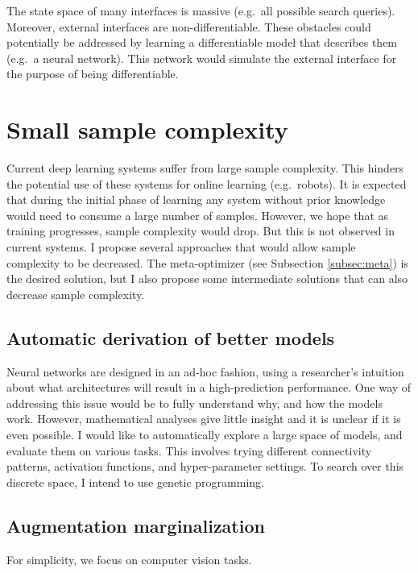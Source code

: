 \documentclass{article}
\begin{document}
The state space of many interfaces is massive (e.g.\ all possible search queries).
Moreover, external interfaces are non-differentiable.
These obstacles could potentially be addressed by learning a differentiable 
model that describes them (e.g.~a neural network). This network would simulate the
external interface for the purpose of being differentiable. 

\section{Small sample complexity}
Current deep learning systems suffer from large sample
complexity. This hinders the potential use of these systems for online 
learning (e.g.~robots). It is expected that during the initial phase of 
learning any system without prior knowledge would need to consume a large number of samples. 
However, we hope that as training progresses, sample complexity would drop. But this is 
not observed in current systems. I propose several approaches that would
allow sample complexity to be decreased. 
The meta-optimizer (see Subsection \ref{subsec:meta}) is the desired
solution, but I also propose some intermediate solutions that can also
decrease sample complexity.

\subsection{Automatic derivation of better models}
Neural networks are designed in an ad-hoc fashion, using a researcher's
intuition about what architectures will result in a high-prediction
performance. One way of addressing this issue would be to
fully understand why, and how the models work. However, mathematical
analyses give little insight and it is unclear if it is even 
possible. I would like to automatically
explore a large space of models, and evaluate them on various tasks. 
This involves trying different connectivity patterns, activation
functions, and hyper-parameter settings. To search over this discrete
space, I intend to use genetic programming. 


\subsection{Augmentation marginalization}
For simplicity, we focus on computer vision tasks.
\end{document}
